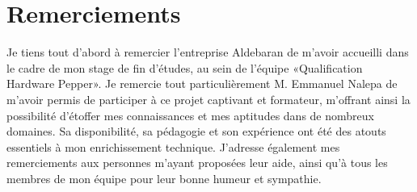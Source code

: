 \chapter*{Remerciements}

Je tiens tout d'abord à remercier l'entreprise Aldebaran de m'avoir accueilli dans le cadre de mon stage de fin d'études, au sein de l'équipe «Qualification Hardware Pepper».
\newline 
Je remercie tout particulièrement M. Emmanuel Nalepa de m'avoir permis de participer à ce projet captivant et formateur, m’offrant ainsi la possibilité d'étoffer mes connaissances et mes aptitudes dans de nombreux domaines. Sa disponibilité, sa pédagogie et son expérience ont été des atouts essentiels à mon enrichissement technique.
\newline
J’adresse également mes remerciements aux personnes m'ayant proposées leur aide, ainsi qu'à tous les membres de mon équipe pour leur bonne humeur et sympathie.